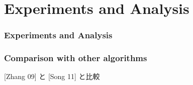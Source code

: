 \section{Experiments and Analysis}

\begin{frame}\frametitle{Experiments and Analysis}
\end{frame}

\begin{frame}\frametitle{Comparison with other algorithms}
[Zhang 09] と [Song 11] と比較
\end{frame}
